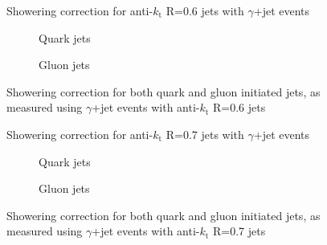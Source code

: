 \clearpage
\begin{figure}[!ht]
 \centering
 \caption[Showering correction for anti-$k_{\mathrm t}$ R=0.6 jets with $\gamma$+jet events]
 {\small Showering correction for anti-$k_{\mathrm t}$ R=0.6 jets with $\gamma$+jet events}
 \label{plot:GJetShowering6App}
\end{figure}

\begin{figure}[!ht]
 \centering
 \begin{subfigure}{.5\textwidth}
  \centering
  \caption{Quark jets}
 \end{subfigure}%
 \begin{subfigure}{.5\textwidth}
  \centering
  \caption{Gluon jets}
 \end{subfigure}
 \caption[Quark/gluon jet showering correction, anti-$k_{\mathrm t}$ R=0.6, $\gamma$+jet]
 {\small Showering correction for both quark and gluon initiated jets, as measured using $\gamma$+jet events with anti-$k_{\mathrm t}$ R=0.6 jets}
 \label{plot:GJetShoweringFlav6App}
\end{figure}

\clearpage
\begin{figure}[!ht]
 \centering
 \caption[Showering correction for anti-$k_{\mathrm t}$ R=0.7 jets with $\gamma$+jet events]
 {\small Showering correction for anti-$k_{\mathrm t}$ R=0.7 jets with $\gamma$+jet events}
 \label{plot:GJetShowering7App}
\end{figure}

\begin{figure}[!ht]
 \centering
 \begin{subfigure}{.5\textwidth}
  \centering
  \caption{Quark jets}
 \end{subfigure}%
 \begin{subfigure}{.5\textwidth}
  \centering
  \caption{Gluon jets}
 \end{subfigure}
 \caption[Quark/gluon jet showering correction, anti-$k_{\mathrm t}$ R=0.7, $\gamma$+jet]
 {\small Showering correction for both quark and gluon initiated jets, as measured using $\gamma$+jet events with anti-$k_{\mathrm t}$ R=0.7 jets}
 \label{plot:GJetShoweringFlav7App}
\end{figure}

